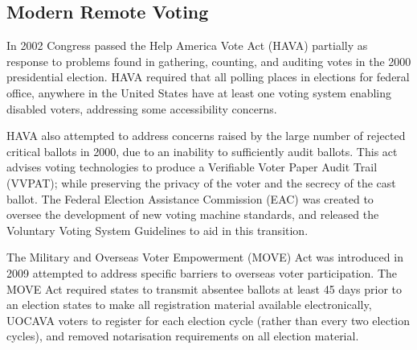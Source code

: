 \subsection{Modern Remote Voting}

In 2002 Congress passed the Help America Vote Act (HAVA) partially as response
to problems found in gathering, counting, and auditing votes in the 2000
presidential election. HAVA required that all polling places in elections for
federal office, anywhere in the United States have at least one voting system
enabling disabled voters, addressing some accessibility concerns.

HAVA also attempted to address concerns raised by the large number of rejected
critical ballots in 2000, due to an inability to sufficiently audit ballots.
This act advises voting technologies to produce a Verifiable Voter Paper Audit
Trail (VVPAT); while preserving the privacy of the voter and the secrecy of the
cast ballot. The Federal Election Assistance Commission (EAC) was created to
oversee the development of new voting machine standards, and released the
Voluntary Voting System Guidelines to aid in this transition.

The Military and Overseas Voter Empowerment (MOVE) Act was introduced in 2009
attempted to address specific barriers to overseas voter participation. The
MOVE Act required states to transmit absentee ballots at least 45 days prior to
an election states to make all registration material available electronically,
UOCAVA voters to register for each election cycle (rather than every two
election cycles), and removed notarisation requirements on all election
material.



